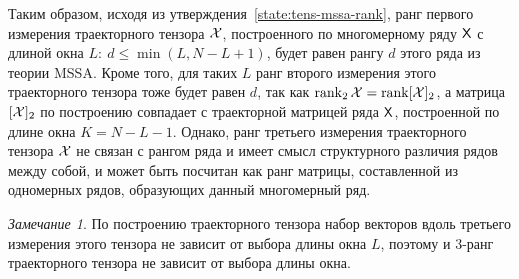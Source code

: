 \documentclass[specialist,
    substylefile = spbu_report.rtx,
    subf,href,colorlinks=true, 12pt]{disser}
\theoremstyle{plain}
\theoremstyle{definition}
\newtheorem{definition}{Определение}[section]
\theoremstyle{remark}
\newtheorem*{remark}{Замечание}
\begin{document}
    Таким образом, исходя из утверждения~\ref{state:tens-mssa-rank}, ранг первого измерения траекторного тензора
    $\mathcal{X}$, построенного по многомерному ряду $\mathsf{X}$ с длиной окна $L:\: {d \leqslant\min(L, N-L+1)}$,
    будет равен рангу $d$ этого ряда из теории MSSA.
    Кроме того, для таких $L$ ранг второго измерения этого траекторного тензора
    тоже будет равен $d$, так как $\operatorname{rank}_2 \mathcal{X} = \operatorname{rank}[\mathcal{X}]_2$,
    а матрица $[\mathcal{X}]_2$ по построению совпадает с траекторной матрицей ряда $\mathsf{X}$, построенной по длине
    окна $K = N - L - 1$.
    Однако, ранг третьего измерения траекторного тензора $\mathcal{X}$ не связан с рангом ряда и имеет смысл
    структурного различия рядов между собой, и может быть посчитан как ранг матрицы, составленной
    из одномерных рядов, образующих данный многомерный ряд.

%

    \begin{remark}
        По построению траекторного тензора набор векторов вдоль третьего измерения этого тензора
        не зависит от выбора длины окна $L$, поэтому и $3$-ранг траекторного тензора не зависит от выбора
        длины окна.
    \end{remark}
\end{document}
